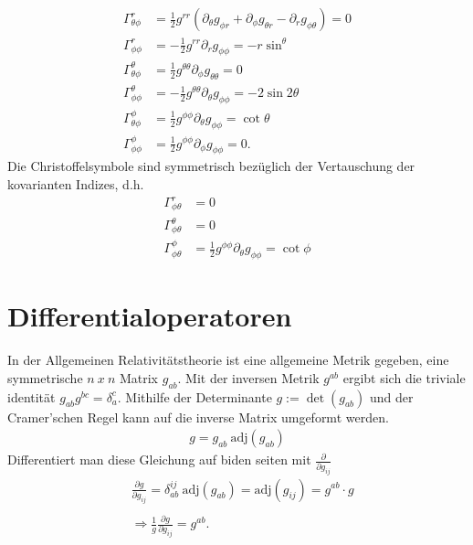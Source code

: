 \documentclass[a4paper]{article}
\begin{document}
\begin{align}
\Gamma^{r}_{\theta\phi}&=\frac{1}{2}g^{rr}(\partial_\theta g_{\phi r}
+\partial_\phi g_{\theta r} - \partial_r g_{\phi\theta}) = 0\\
    \Gamma^{r}_{\phi\phi} &=-\frac{1}{2}g^{rr}\partial_r g_{\phi\phi}=
    -r\sin^\theta\\
    \Gamma^{\theta}_{\theta\phi} &= \frac{1}{2}g^{\theta\theta}\partial_\phi
    g_{\theta\theta} = 0\\
    \Gamma^{\theta}_{\phi\phi} &= -\frac{1}{2}g^{\theta\theta}\partial_\theta
    g_{\phi\phi} = -2\sin2\theta\\
    \Gamma^{\phi}_{\theta\phi} &= \frac{1}{2}g^{\phi\phi}\partial_\theta
    g_{\phi\phi} = \cot\theta\\
    \Gamma^{\phi}_{\phi\phi} &= \frac{1}{2}g^{\phi\phi}\partial_\phi
    g_{\phi\phi} = 0.
\end{align}
Die Christoffelsymbole sind symmetrisch bezüglich der Vertauschung der
kovarianten Indizes, d.h.
\begin{align}
    \Gamma^r_{\phi\theta} &= 0\\
    \Gamma^\theta_{\phi\theta} &= 0 \\
    \Gamma^\phi_{\phi\theta} & = \frac{1}{2} g^{\phi\phi} \partial_\theta
    g_{\phi\phi} = \cot\phi
\end{align}
\section{Differentialoperatoren}
In der Allgemeinen Relativitätstheorie ist eine allgemeine Metrik gegeben,
eine symmetrische $n\ x\ n$ Matrix $g_{ab}$. Mit der inversen Metrik $g^{ab}$
ergibt sich die triviale identität $g_{ab}g^{bc} = \delta ^c_a$. Mithilfe der
Determinante $g := \det(g_{ab})$ und der Cramer'schen Regel
kann auf die inverse Matrix umgeformt
werden.
\begin{align}
    g = g_{ab}\ \text{adj}(g_{ab})
\end{align}
Differentiert man diese Gleichung auf biden seiten mit
$\frac{\partial}{\partial g_{ij}}$
\begin{align}
    &\frac{\partial g }{\partial g_{ij}} = \delta_{ab}^{ij}\
    \text{adj}(g_{ab}) = \text{adj}(g_{ij}) = g^{ab} \cdot g \\
    \nonumber \\
    &\Rightarrow \frac{1}{g} \frac{\partial g}{\partial g_{ij}} =
    g^{ab}.
\end{align}
\end{document}

